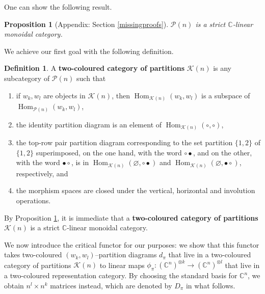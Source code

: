 \documentclass{article}
\DeclareMathOperator{\Hom}{Hom}
\theoremstyle{plain}
\newtheorem{proposition}[theorem]{Proposition}
\theoremstyle{definition}
\newtheorem{definition}[theorem]{Definition}
\theoremstyle{remark}
\begin{document}
One can show the following result.

\begin{proposition}[Appendix: Section \ref{missingproofs}] \label{twocolmonoidal}
	$\mathcal{P}(n)$
	is a strict $\mathbb{C}$-linear monoidal category.
\end{proposition}

We achieve our first goal with the following definition.
\begin{definition} \label{twocolcatpart}
	A \textbf{two-coloured category of partitions} $\mathcal{K}(n)$ is any subcategory of $\mathcal{P}(n)$ such that 
	\begin{enumerate}
		\item if $w_k, w_l$ are objects in $\mathcal{K}(n)$, then
			$\Hom_{\mathcal{K}(n)}(w_k,w_l)$ 
			is a subspace of $\Hom_{\mathcal{P}(n)}(w_k,w_l)$, 
		\item the identity partition diagram is an element of 
			$\Hom_{\mathcal{K}(n)}(\circ,\circ)$,
		\item the top-row pair partition diagram corresponding to the set partition $\{1,2\}$ of $\{1,2\}$ superimposed, on the one hand,
			with the word $\circ\bullet$,
			and on the other,
			with the word $\bullet\circ$,
			is in 
			$\Hom_{\mathcal{K}(n)}(\varnothing,\circ\bullet)$
			and
			$\Hom_{\mathcal{K}(n)}(\varnothing,\bullet\circ)$, respectively,
			and
		\item the morphism spaces are closed
			under the vertical, horizontal and involution operations.
	\end{enumerate}
	By Proposition \ref{twocolmonoidal},
	it is immediate that a \textbf{two-coloured category of partitions} 
	$\mathcal{K}(n)$ is a strict $\mathbb{C}$-linear monoidal category.
\end{definition}

We now introduce the critical functor for our purposes: 
we show that this functor takes two-coloured $(w_k,w_l)$--partition diagrams $d_\pi$ 
that live in a two-coloured category of partitions $\mathcal{K}(n)$
to linear maps 
$\phi_\pi: (\mathbb{C}^n)^{\otimes k} \rightarrow (\mathbb{C}^n)^{\otimes l}$ 
that live in a two-coloured representation category.
By choosing the standard basis for $\mathbb{C}^{n}$, we obtain 
$n^l \times n^k$ matrices instead, which are denoted by $D_\pi$
in what follows.
\end{document}
